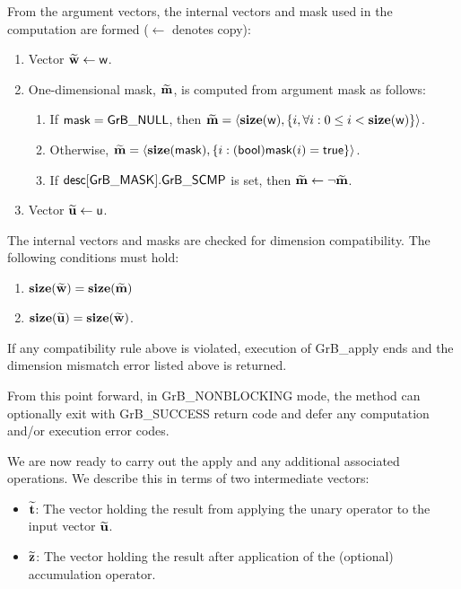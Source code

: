 From the argument vectors, the internal vectors and mask used in 
the computation are formed ($\leftarrow$ denotes copy):
\begin{enumerate}
	\item Vector ${\bf \widetilde{w}} \leftarrow {\sf w}$.

	\item One-dimensional mask, ${\bf \widetilde{m}}$, is computed from 
    argument {\sf mask} as follows:
	\begin{enumerate}
		\item	If ${\sf mask} = {\sf GrB\_NULL}$, then ${\bf \widetilde{m}} = 
        \langle \bold{size}({\sf w}), \{i, \forall i : 0 \leq i < 
        \bold{size}({\sf w}) \} \rangle$.

		\item	Otherwise, ${\bf \widetilde{m}} = 
        \langle \bold{size}({\sf mask}), \{i : ({\sf bool}){\sf mask}(i) = 
        {\sf true}\} \rangle$.

		\item	If ${\sf desc[GrB\_MASK].GrB\_SCMP}$ is set, then 
        ${\bf \widetilde{m}} \leftarrow \neg {\bf \widetilde{m}}$.
	\end{enumerate}

	\item Vector ${\bf \widetilde{u}} \leftarrow {\sf u}$.
\end{enumerate}

The internal vectors and masks are checked for dimension compatibility. 
The following conditions must hold:
\begin{enumerate}
	\item $\bold{size}({\bf \widetilde{w}}) = \bold{size}({\bf \widetilde{m}})$
    \item $\bold{size}({\bf \widetilde{u}}) = \bold{size}({\bf \widetilde{w}})$.
\end{enumerate}
If any compatibility rule above is violated, execution of {\sf GrB\_apply} ends and 
the dimension mismatch error listed above is returned.

From this point forward, in {\sf GrB\_NONBLOCKING} mode, the method can 
optionally exit with {\sf GrB\_SUCCESS} return code and defer any computation 
and/or execution error codes.

We are now ready to carry out the apply and any additional 
associated operations.  We describe this in terms of two intermediate vectors:
\begin{itemize}
    \item ${\bf \widetilde{t}}$: The vector holding the result from applying the unary operator to the input vector
    ${\bf \widetilde{u}}$.
    \item ${\bf \widetilde{z}}$: The vector holding the result after 
    application of the (optional) accumulation operator.
\end{itemize}

